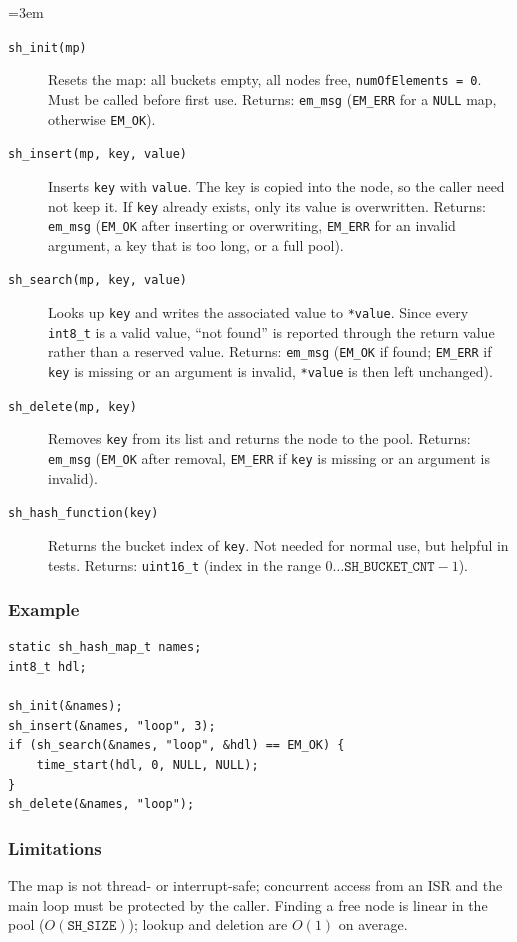 {\sloppy\emergencystretch=3em
\begin{description}
\item[\texttt{sh\_init(mp)}] Resets the map: all buckets empty, all nodes
  free, \verb|numOfElements = 0|. Must be called before first use. Returns:
  \verb|em_msg| (\verb|EM_ERR| for a \verb|NULL| map, otherwise
  \verb|EM_OK|).
\item[\texttt{sh\_insert(mp, key, value)}] Inserts \verb|key| with
  \verb|value|. The key is copied into the node, so the caller need not keep
  it. If \verb|key| already exists, only its value is overwritten. Returns:
  \verb|em_msg| (\verb|EM_OK| after inserting or overwriting, \verb|EM_ERR|
  for an invalid argument, a key that is too long, or a full pool).
\item[\texttt{sh\_search(mp, key, value)}] Looks up \verb|key| and writes
  the associated value to \verb|*value|. Since every \verb|int8_t| is a valid
  value, ``not found'' is reported through the return value rather than
  a reserved value. Returns: \verb|em_msg| (\verb|EM_OK| if found;
  \verb|EM_ERR| if \verb|key| is missing or an argument is invalid,
  \verb|*value| is then left unchanged).
\item[\texttt{sh\_delete(mp, key)}] Removes \verb|key| from its list and
  returns the node to the pool. Returns: \verb|em_msg| (\verb|EM_OK| after
  removal, \verb|EM_ERR| if \verb|key| is missing or an argument is invalid).
\item[\texttt{sh\_hash\_function(key)}] Returns the bucket index of
  \verb|key|. Not needed for normal use, but helpful in tests. Returns:
  \verb|uint16_t| (index in the range
  $0 \ldots \mathtt{SH\_BUCKET\_CNT} - 1$).
\end{description}
\par}

\subsubsection*{Example}
\begin{listing}[H]
\begin{verbatim}
static sh_hash_map_t names;
int8_t hdl;

sh_init(&names);
sh_insert(&names, "loop", 3);
if (sh_search(&names, "loop", &hdl) == EM_OK) {
    time_start(hdl, 0, NULL, NULL);
}
sh_delete(&names, "loop");
\end{verbatim}
\caption{Using \texttt{string\_hash}}
\label{sh_example}
\end{listing}

\subsubsection*{Limitations}
The map is not thread- or interrupt-safe; concurrent access from an ISR and
the main loop must be protected by the caller. Finding a free node is linear
in the pool ($O(\mathtt{SH\_SIZE})$); lookup and deletion are $O(1)$ on
average.
